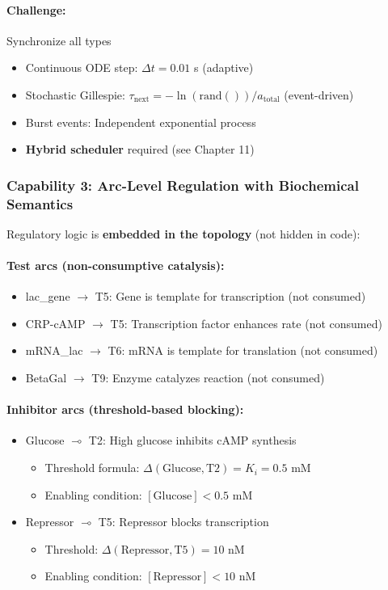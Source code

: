 \paragraph{Challenge:} Synchronize all types
\begin{itemize}
    \item Continuous ODE step: $\Delta t = 0.01$ s (adaptive)
    \item Stochastic Gillespie: $\tau_{\text{next}} = -\ln(\text{rand}()) / a_{\text{total}}$ (event-driven)
    \item Burst events: Independent exponential process
    \item \textbf{Hybrid scheduler} required (see Chapter 11)
\end{itemize}

\subsubsection{Capability 3: Arc-Level Regulation with Biochemical Semantics}

Regulatory logic is \textbf{embedded in the topology} (not hidden in code):

\paragraph{Test arcs (non-consumptive catalysis):}
\begin{itemize}
    \item lac\_gene $\to$ T5: Gene is template for transcription (not consumed)
    \item CRP-cAMP $\to$ T5: Transcription factor enhances rate (not consumed)
    \item mRNA\_lac $\to$ T6: mRNA is template for translation (not consumed)
    \item BetaGal $\to$ T9: Enzyme catalyzes reaction (not consumed)
\end{itemize}

\paragraph{Inhibitor arcs (threshold-based blocking):}
\begin{itemize}
    \item Glucose $\multimap$ T2: High glucose inhibits cAMP synthesis
    \begin{itemize}
        \item Threshold formula: $\Delta(\text{Glucose}, \text{T2}) = K_i = 0.5$ mM
        \item Enabling condition: $[\text{Glucose}] < 0.5$ mM
    \end{itemize}
    \item Repressor $\multimap$ T5: Repressor blocks transcription
    \begin{itemize}
        \item Threshold: $\Delta(\text{Repressor}, \text{T5}) = 10$ nM
        \item Enabling condition: $[\text{Repressor}] < 10$ nM
    \end{itemize}
\end{itemize}

